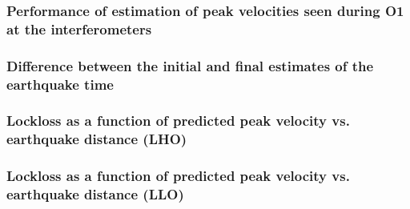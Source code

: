 \documentclass[ignorenonframetext,t,10pt]{beamer}
\begin{document}
\begin{frame}
  \frametitle{Performance of estimation of peak velocities seen during O1 at the interferometers}
\begin{center}
\begin{figure}[hbtp!]
\end{figure}
\end{center}
\end{frame}

\begin{frame}
  \frametitle{Difference between the initial and final estimates of the earthquake time}
\begin{center}
\begin{figure}[hbtp!]
\end{figure}
\end{center}
\end{frame}

\begin{frame}
  \frametitle{Lockloss as a function of predicted peak velocity vs. earthquake distance (LHO)}
\begin{center}
\begin{figure}[hbtp!]
\end{figure}
\end{center}
\end{frame}

\begin{frame}
  \frametitle{Lockloss as a function of predicted peak velocity vs. earthquake distance (LLO)}
\begin{center}
\begin{figure}[hbtp!]
\end{figure}
\end{center}
\end{frame}
\end{document}
